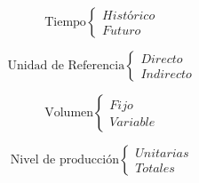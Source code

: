 \[
\text{Tiempo}
\begin{cases}
Histórico \\ Futuro
\end{cases}
\]

\[
\text{Unidad de Referencia}
\begin{cases}
Directo \\ Indirecto
\end{cases}
\]

\[
\text{Volumen}
\begin{cases}
Fijo \\ Variable
\end{cases}
\]

\[
\text{Nivel de producción}
\begin{cases}
Unitarias \\ Totales
\end{cases}
\]

